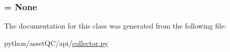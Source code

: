 \hypertarget{classassetQC_1_1api_1_1collector_1_1Collector_a04e5b834434542aaca4811452dddeff2}{
\subsubsection[{priority}]{ = \-None}}\label{d4/d7c/classassetQC_1_1api_1_1collector_1_1Collector_a04e5b834434542aaca4811452dddeff2}


\-The documentation for this class was generated from the following file\-:\begin{DoxyCompactItemize}
\item 
python/asset\-Q\-C/api/\hyperlink{collector_8py}{collector.\-py}\end{DoxyCompactItemize}
